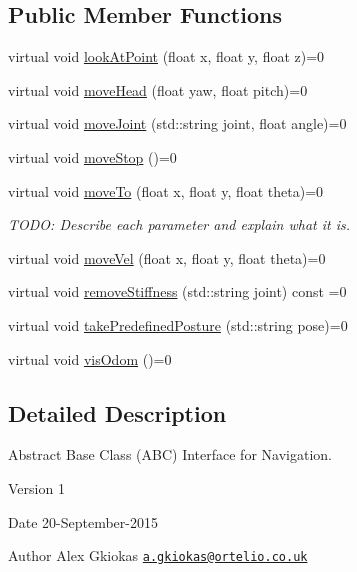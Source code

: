 \subsection*{Public Member Functions}
\begin{DoxyCompactItemize}
\item 
virtual void \hyperlink{classrapp_1_1robot_1_1navigation_a3b9fa18bda273730de4439f324c1bcfb}{look\-At\-Point} (float x, float y, float z)=0
\item 
virtual void \hyperlink{classrapp_1_1robot_1_1navigation_afb8024b5245696ea13c2143912fe1bb2}{move\-Head} (float yaw, float pitch)=0
\item 
virtual void \hyperlink{classrapp_1_1robot_1_1navigation_ae23002930f3df05efea1db90b7ede477}{move\-Joint} (std\-::string joint, float angle)=0
\item 
virtual void \hyperlink{classrapp_1_1robot_1_1navigation_a1ed5e2e425e54f18ff1708ff4f91423e}{move\-Stop} ()=0
\item 
virtual void \hyperlink{classrapp_1_1robot_1_1navigation_ab9015aedc583ec4a86cf3c4a28a9eede}{move\-To} (float x, float y, float theta)=0
\begin{DoxyCompactList}\small\item\em T\-O\-D\-O\-: Describe each parameter and explain what it is. \end{DoxyCompactList}\item 
virtual void \hyperlink{classrapp_1_1robot_1_1navigation_ad9edf8af6a0ed5660c4ff1cb93752f3d}{move\-Vel} (float x, float y, float theta)=0
\item 
virtual void \hyperlink{classrapp_1_1robot_1_1navigation_ae8585c277d4e0f967f4a3a5555ca15d4}{remove\-Stiffness} (std\-::string joint) const =0
\item 
virtual void \hyperlink{classrapp_1_1robot_1_1navigation_a135033e445d05cc3e50c3942d47e296e}{take\-Predefined\-Posture} (std\-::string pose)=0
\item 
virtual void \hyperlink{classrapp_1_1robot_1_1navigation_aefd121347fad3dabed99dae344067ca4}{vis\-Odom} ()=0
\end{DoxyCompactItemize}


\subsection{Detailed Description}
Abstract Base Class (A\-B\-C) Interface for Navigation. 

\begin{DoxyVersion}{Version}
1 
\end{DoxyVersion}
\begin{DoxyDate}{Date}
20-\/\-September-\/2015 
\end{DoxyDate}
\begin{DoxyAuthor}{Author}
Alex Gkiokas \href{mailto:a.gkiokas@ortelio.co.uk}{\tt a.\-gkiokas@ortelio.\-co.\-uk} 
\end{DoxyAuthor}


